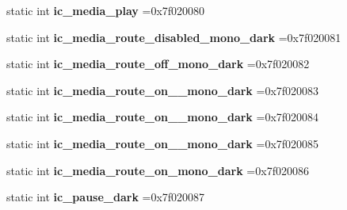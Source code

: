 \begin{DoxyCompactItemize}
static int {\bfseries ic\+\_\+media\+\_\+play} =0x7f020080
\item 
\mbox{\label{classandroid_1_1support_1_1v7_1_1recyclerview_1_1R_1_1drawable_ab8ab803d9b65ccf4fecddbf965015100}} 
static int {\bfseries ic\+\_\+media\+\_\+route\+\_\+disabled\+\_\+mono\+\_\+dark} =0x7f020081
\item 
\mbox{\label{classandroid_1_1support_1_1v7_1_1recyclerview_1_1R_1_1drawable_afdd6d72a62cf2cbcfac9b233cf1896c3}} 
static int {\bfseries ic\+\_\+media\+\_\+route\+\_\+off\+\_\+mono\+\_\+dark} =0x7f020082
\item 
\mbox{\label{classandroid_1_1support_1_1v7_1_1recyclerview_1_1R_1_1drawable_a07e493b3a6717c09201bc1e3544d749f}} 
static int {\bfseries ic\+\_\+media\+\_\+route\+\_\+on\+\_\+\_\+mono\+\_\+dark} =0x7f020083
\item 
\mbox{\label{classandroid_1_1support_1_1v7_1_1recyclerview_1_1R_1_1drawable_aebe966bdec1fb64752dde0f527de276e}} 
static int {\bfseries ic\+\_\+media\+\_\+route\+\_\+on\+\_\+\_\+mono\+\_\+dark} =0x7f020084
\item 
\mbox{\label{classandroid_1_1support_1_1v7_1_1recyclerview_1_1R_1_1drawable_a45301ccbc7e58c18430fb322a062e504}} 
static int {\bfseries ic\+\_\+media\+\_\+route\+\_\+on\+\_\+\_\+mono\+\_\+dark} =0x7f020085
\item 
\mbox{\label{classandroid_1_1support_1_1v7_1_1recyclerview_1_1R_1_1drawable_ab4b157800c82b1c7febbc19021c7d115}} 
static int {\bfseries ic\+\_\+media\+\_\+route\+\_\+on\+\_\+mono\+\_\+dark} =0x7f020086
\item 
\mbox{\label{classandroid_1_1support_1_1v7_1_1recyclerview_1_1R_1_1drawable_ab0aea0bc873532437f651dfd45722ea3}} 
static int {\bfseries ic\+\_\+pause\+\_\+dark} =0x7f020087
\item 

\end{DoxyCompactItemize}

